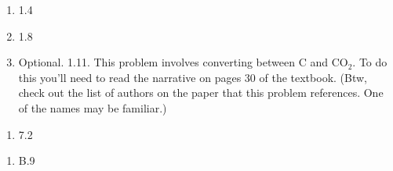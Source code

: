 \documentclass[12pt]{article}
\begin{document}
\begin{enumerate}
  \setlength{\itemsep}{-1mm}
\item 1.4
\item 1.8
  \item Optional.  1.11.  This problem involves converting between C
    and CO$_2$. To do this you'll need to read the narrative on pages 
    30 of the textbook.  (Btw, check out the list of authors on the
    paper that this problem references.  One of the names may be
    familiar.) 
\end{enumerate}

\begin{enumerate}
\setlength{\itemsep}{-1mm}
\item 7.2
\end{enumerate}



\begin{enumerate}
\setlength{\itemsep}{-1mm}
\item B.9
\end{enumerate}
\end{document}
